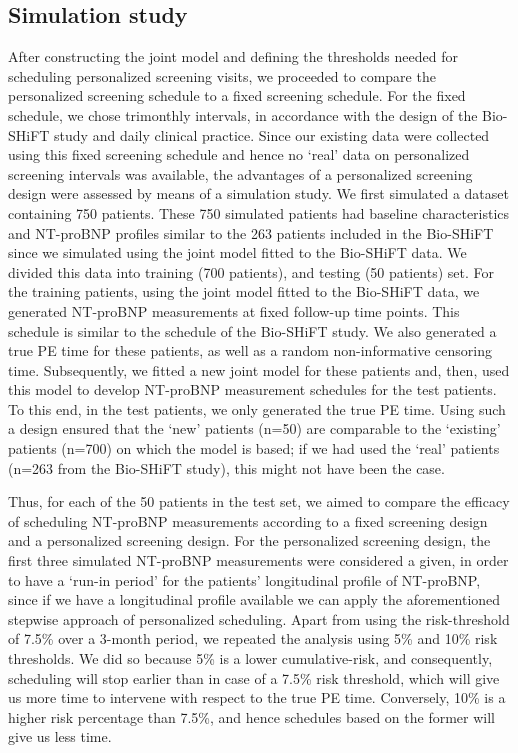 \subsection{Simulation study}
After constructing the joint model and defining the thresholds needed for scheduling personalized screening visits, we proceeded to compare the personalized screening schedule to a fixed screening schedule. For the fixed schedule, we chose trimonthly intervals, in accordance with the design of the Bio-SHiFT study and daily clinical practice. Since our existing data were collected using this fixed screening schedule and hence no ‘real' data on personalized screening intervals was available, the advantages of a personalized screening design were assessed by means of a simulation study. 
We first simulated a dataset containing 750 patients. These 750 simulated patients had baseline characteristics and NT-proBNP profiles similar to the 263 patients included in the Bio-SHiFT since we simulated using the joint model fitted to the Bio-SHiFT data. We divided this data into training (700 patients), and testing (50 patients) set. For the training patients, using the joint model fitted to the Bio-SHiFT data, we generated NT-proBNP measurements at fixed follow-up time points. This schedule is similar to the schedule of the Bio-SHiFT study. We also generated a true PE time for these patients, as well as a random non-informative censoring time. Subsequently, we fitted a new joint model for these patients and, then, used this model to develop NT-proBNP measurement schedules for the test patients. To this end, in the test patients, we only generated the true PE time. Using such a design ensured that the ‘new' patients (n=50) are comparable to the ‘existing' patients (n=700) on which the model is based; if we had used the ‘real' patients (n=263 from the Bio-SHiFT study), this might not have been the case. 

Thus, for each of the 50 patients in the test set, we aimed to compare the efficacy of scheduling NT-proBNP measurements according to a fixed screening design and a personalized screening design. For the personalized screening design, the first three simulated NT-proBNP measurements were considered a given, in order to have a ‘run-in period' for the patients' longitudinal profile of NT-proBNP, since if we have a longitudinal profile available we can apply the aforementioned stepwise approach of personalized scheduling. Apart from using the risk-threshold of 7.5\% over a 3-month period, we repeated the analysis using 5\% and 10\% risk thresholds. We did so because 5\% is a lower cumulative-risk, and consequently, scheduling will stop earlier than in case of a 7.5\% risk threshold, which will give us more time to intervene with respect to the true PE time. Conversely, 10\% is a higher risk percentage than 7.5\%, and hence schedules based on the former will give us less time. 

